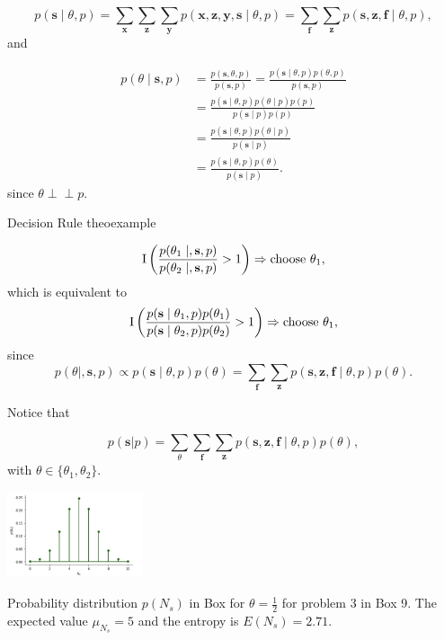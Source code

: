 \documentclass{tufte-handout}
\def\ci{\perp\!\!\!\perp}
\begin{document}
$$ p(\mathbf s \mid \theta, p) =  \sum_{\mathbf x}  \sum_{\mathbf z} \sum_{\mathbf y} p(\mathbf x, \mathbf z, \mathbf y, \mathbf s \mid \theta, p) =  \sum_{\mathbf f} \sum_{\mathbf z} p(\mathbf s, \mathbf z, \mathbf f \mid \theta, p),$$ and

\begin{align*}
p(\theta\mid \mathbf s, p) &= \frac{p(\mathbf s, \theta, p)}{p( \mathbf s, p)}= \frac{p(\mathbf s\mid \theta, p)p(\theta,p)}{p( \mathbf s, p)} \\
                                         &=  \frac{p(\mathbf s\mid \theta, p)p(\theta\mid p)p(p)}{p( \mathbf s\mid p)p(p)}\\
                                         &=  \frac{p(\mathbf s\mid \theta, p)p(\theta\mid p)}{p( \mathbf s\mid p)}\\
                                         &=  \frac{p(\mathbf s\mid \theta, p)p(\theta)}{p( \mathbf s\mid p)}. 
\end{align*}
since $\theta \ci p$.

 \begin{mybox}{Decision Rule }{theoexample}

$$ \mathrm I\left(\frac{p(\theta_1 \mid ,\mathbf s,  p)}  {p(\theta_2 \mid ,\mathbf s,  p)} > 1 \right)  \Rightarrow \text{choose $ \theta_1$},$$ 
which is equivalent to
$$ \mathrm I\left(\frac{p(\mathbf s \mid \theta_1, p)p(\theta_1)}  {p(\mathbf s \mid \theta_2, p)p(\theta_2)} > 1 \right)  \Rightarrow \text{choose $ \theta_1$},$$ 
since
$$p(\theta \mid ,\mathbf s,  p) \propto  p(\mathbf s \mid \theta, p)p(\theta) =    \sum_{\mathbf f} \sum_{\mathbf z} p(\mathbf s, \mathbf z, \mathbf f \mid \theta, p) p(\theta).$$

Notice that 

$$ p(\mathbf s|p) = \sum_{\theta} \sum_{\mathbf f} \sum_{\mathbf z} p(\mathbf s, \mathbf z, \mathbf f \mid \theta, p)p(\theta),$$ with $\theta \in \{\theta_1,\theta_2\}.$

\end{mybox}

\begin{marginfigure}
\centering
\includegraphics[width=4cm]{fig/12.png}
\caption{Probability distribution $p(N_s)$ in Box for $\theta= \frac{1}{2}$ for problem 3 in Box 9.
The expected value $\mu_{N_s}= 5$ and the entropy is $E(N_s)=2.71$.
}
\end{marginfigure}
\end{document}
